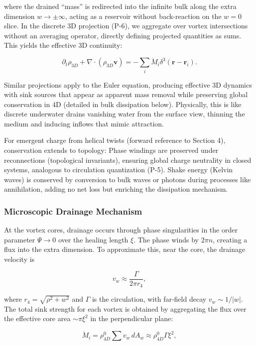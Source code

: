 where the drained ``mass'' is redirected into the infinite bulk along the extra dimension $w \to \pm \infty$, acting as a reservoir without back-reaction on the $w=0$ slice. In the discrete 3D projection (P-6), we aggregate over vortex intersections without an averaging operator, directly defining projected quantities as sums. This yields the effective 3D continuity:

\begin{equation}
\partial_t \rho_{3D} + \nabla \cdot (\rho_{3D} \mathbf{v}) = -\sum_i \dot{M}_i \delta^3(\mathbf{r} - \mathbf{r}_i).
\end{equation}

Similar projections apply to the Euler equation, producing effective 3D dynamics with sink sources that appear as apparent mass removal while preserving global conservation in 4D (detailed in bulk dissipation below). Physically, this is like discrete underwater drains vanishing water from the surface view, thinning the medium and inducing inflows that mimic attraction.

For emergent charge from helical twists (forward reference to Section 4), conservation extends to topology: Phase windings are preserved under reconnections (topological invariants), ensuring global charge neutrality in closed systems, analogous to circulation quantization (P-5). Shake energy (Kelvin waves) is conserved by conversion to bulk waves or photons during processes like annihilation, adding no net loss but enriching the dissipation mechanism.

\subsubsection{Microscopic Drainage Mechanism}
At the vortex cores, drainage occurs through phase singularities in the order parameter $\Psi \to 0$ over the healing length $\xi$. The phase winds by $2\pi n$, creating a flux into the extra dimension. To approximate this, near the core, the drainage velocity is

\begin{equation}
v_w \approx \frac{\Gamma}{2\pi r_4},
\end{equation}

where $r_4 = \sqrt{\rho^2 + w^2}$ and $\Gamma$ is the circulation, with far-field decay $v_w \sim 1/|w|$. The total sink strength for each vortex is obtained by aggregating the flux over the effective core area $\sim \pi \xi^2$ in the perpendicular plane:

\begin{equation}
\dot{M}_i = \rho_{4D}^0 \sum v_w \, dA_w \approx \rho_{4D}^0 \Gamma \xi^2,
\end{equation}

